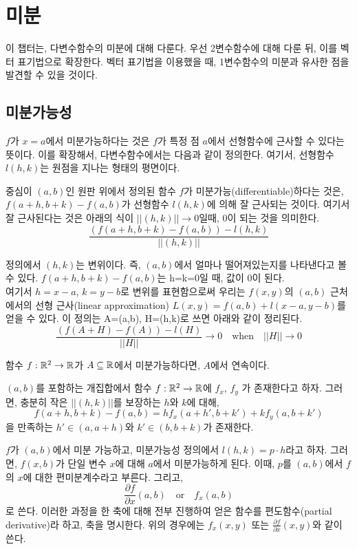 \section{미분}

이 챕터는, 다변수함수의 미분에 대해 다룬다. 우선 2변수함수에 대해 다룬 뒤, 이를 벡터 표기법으로 확장한다. 벡터 표기법을 이용했을 때, 1변수함수의 미분과 유사한 점을 발견할 수 있을 것이다.

\subsection{미분가능성}
$f$가 $x=a$에서 미분가능하다는 것은 $f$가 특정 점 $a$에서 선형함수에 근사할 수 있다는 뜻이다. 이를 확장해서, 다변수함수에서는 다음과 같이 정의한다. 여기서, 선형함수 $l(h,k)$는 원점을 지나는 형태의 평면이다.

\begin{definition}[미분 가능성]
중심이 $(a,b)$인 원판 위에서 정의된 함수 $f$가 미분가능(differentiable)하다는 것은, $f(a+h,b+k)-f(a,b)$가 선형함수 $l(h,k)$에 의해 잘 근사되는 것이다. 여기서 잘 근사된다는 것은 아래의 식이 $||(h,k)|| \to 0$일때, 0이 되는 것을 의미한다.
$$\frac{(f(a+h,b+k)-f(a,b))-l(h,k)}{||(h,k)||}$$
\end{definition}

정의에서 $(h,k)$는 변위이다. 즉, $(a,b)$에서 얼마나 떨어져있는지를 나타낸다고 볼 수 있다. $f(a+h,b+k)-f(a,b)$는 h=k=0일 때, 값이 0이 된다.\\
여기서 $h=x-a$, $k=y-b$로 변위를 표현함으로써 우리는 $f(x,y)$의 $(a,b)$ 근처에서의 선형 근사(linear approximation) $L(x,y)=f(a,b)+l(x-a,y-b)$를 얻을 수 있다. 이 정의는 A=(a,b), H=(h,k)로 쓰면 아래와 같이 정리된다.
$$\frac{(f(A+H)-f(A))-l(H)}{||H||} \to 0 \quad \text{when} \quad ||H|| \to 0$$

\begin{theorem}
함수 $f:\mathbb{R}^2 \to \mathbb{R}$가 $A \subseteq \mathbb{R}$에서 미분가능하다면, $A$에서 연속이다.
\end{theorem}

\begin{theorem}
$(a,b)$를 포함하는 개집합에서 함수 $f: \mathbb{R}^2 \to \mathbb{R}$에 $f_x$, $f_y$ 가 존재한다고 하자. 그러면, 충분히 작은 $||(h,k)||$를 보장하는 $h$와 $k$에 대해,
$$f(a+h,b+k)-f(a,b)=hf_x(a+h',b+k')+kf_y(a,b+k')$$
을 만족하는 $h' \in (a,a+h)$와 $k' \in (b,b+k)$가 존재한다.
\end{theorem}

\begin{definition}[편도함수]
$f$가 $(a,b)$에서 미분 가능하고, 미분가능성 정의에서 $l(h,k)=p\cdot h$라고 하자. 그러면, $f(x,b)$가 단일 변수 $x$에 대해 $a$에서 미분가능하게 된다. 이때, $p$를 $(a,b)$에서 $f$의 $x$에 대한 편미분계수라고 부른다. 그리고,
$$\frac{\partial f}{\partial x}(a,b)\quad\text{or}\quad f_x(a,b)$$
로 쓴다. 이러한 과정을 한 축에 대해 전부 진행하여 얻은 함수를 편도함수(partial derivative)라 하고, 축을 명시한다. 위의 경우에는 $f_x(x,y)$ 또는 $\frac{\partial f}{\partial x}(x,y)$와 같이 쓴다.
\end{definition}

